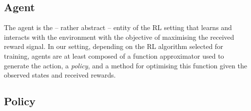 \subsection{Agent}

The agent is the -- rather abstract -- entity of the \ac{RL} setting that learns and interacts with the environment with the objective of maximising the received reward signal.
In our setting, depending on the \ac{RL} algorithm selected for training, agents are at least composed of a function approximator used to generate the action, \ie a \emph{policy}, and a method for optimising this function given the observed states and received rewards.

\subsection{Policy}

